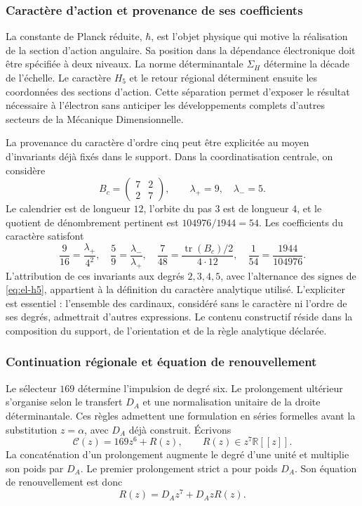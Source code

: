 \subsubsection{Caractère d'action et provenance de ses coefficients}
\label{sec:revision-planck}

La constante de Planck réduite, \(\hbar\), est l'objet physique qui
motive la réalisation de la section d'action angulaire. Sa position dans
la dépendance électronique doit être spécifiée à deux niveaux. La norme
déterminantale \(\Sigma_H\) détermine la décade de l'échelle. Le caractère
\(H_5\) et le retour régional déterminent ensuite les coordonnées des
sections d'action. Cette séparation permet d'exposer le résultat
nécessaire à l'électron sans anticiper les développements complets
d'autres secteurs de la Mécanique Dimensionnelle.

La provenance du caractère d'ordre cinq peut être explicitée au moyen
d'invariants déjà fixés dans le support. Dans la coordinatisation centrale, on considère
\[
 B_c=\begin{pmatrix}7&2\\2&7\end{pmatrix},
 \qquad \lambda_+=9,\quad\lambda_-=5.
\]
Le calendrier est de longueur \(12\), l'orbite du pas \(3\) est de
longueur \(4\), et le quotient de dénombrement pertinent est
\(104976/1944=54\). Les coefficients du caractère satisfont
\begin{equation}
 \frac9{16}=\frac{\lambda_+}{4^2},\quad
 \frac59=\frac{\lambda_-}{\lambda_+},\quad
 \frac7{48}=\frac{\operatorname{tr}(B_c)/2}{4\cdot12},\quad
 \frac1{54}=\frac{1944}{104976}.
 \label{eq:revision-h5-coeficientes}
\end{equation}
L'attribution de ces invariants aux degrés \(2,3,4,5\), avec
l'alternance des signes de \eqref{eq:el-h5}, appartient à la définition du
caractère analytique utilisé. L'expliciter est essentiel : l'ensemble des
cardinaux, considéré sans le caractère ni l'ordre de ses degrés,
admettrait d'autres expressions. Le contenu constructif réside dans la
composition du support, de l'orientation et de la règle analytique déclarée.

\subsubsection{Continuation régionale et équation de renouvellement}

Le sélecteur \(169\) détermine l'impulsion de degré six. Le prolongement
ultérieur s'organise selon le transfert \(D_A\) et une normalisation
unitaire de la droite déterminantale. Ces règles admettent une formulation
en séries formelles avant la substitution \(z=\alpha\), avec \(D_A\) déjà
construit. Écrivons
\[
 \mathscr C(z)=169z^6+R(z),\qquad R(z)\in z^7\mathbb R[[z]].
\]
La concaténation d'un prolongement augmente le degré d'une unité et
multiplie son poids par \(D_A\). Le premier prolongement strict a pour
poids \(D_A\). Son équation de renouvellement est donc
\begin{equation}
 R(z)=D_Az^7+D_AzR(z).
 \label{eq:revision-renovacion}
\end{equation}

